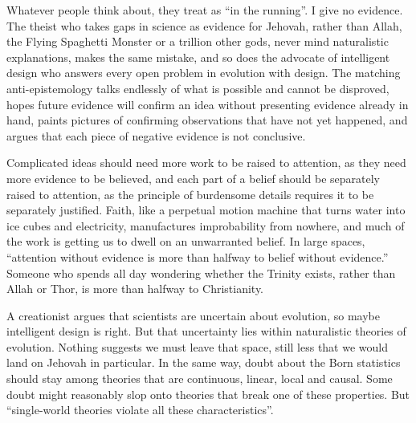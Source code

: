 Whatever people think about, they treat as ``in the running''. I give no evidence.  The theist who takes gaps in science as evidence for Jehovah, rather than Allah, the Flying Spaghetti Monster or a trillion other gods, never mind naturalistic explanations, makes the same mistake, and so does the advocate of intelligent design who answers every open problem in evolution with design. The matching anti-epistemology talks endlessly of what is possible and cannot be disproved, hopes future evidence will confirm an idea without presenting evidence already in hand, paints pictures of confirming observations that have not yet happened, and argues that each piece of negative evidence is not conclusive. 

Complicated ideas should need more work to be raised to attention, as they need more evidence to be believed, and each part of a belief should be separately raised to attention, as the principle of burdensome details requires it to be separately justified. Faith, like a perpetual motion machine that turns water into ice cubes and electricity, manufactures improbability from nowhere, and much of the work is getting us to dwell on an unwarranted belief. In large spaces, ``attention without evidence is more than halfway to belief without evidence.'' Someone who spends all day wondering whether the Trinity exists, rather than Allah or Thor, is more than halfway to Christianity.

A creationist argues that scientists are uncertain about evolution, so maybe intelligent design is right. But that uncertainty lies within naturalistic theories of evolution. Nothing suggests we must leave that space, still less that we would land on Jehovah in particular. In the same way, doubt about the Born statistics should stay among theories that are continuous, linear, local and causal. Some doubt might reasonably slop onto theories that break one of these properties. But ``single-world theories violate all these characteristics''. 
